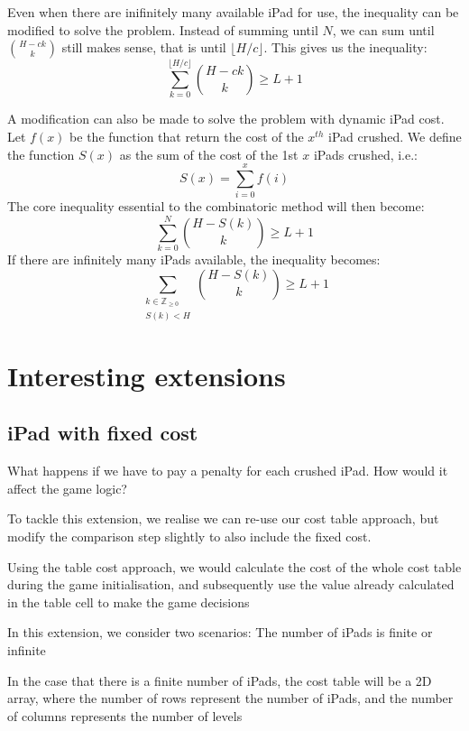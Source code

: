 \documentclass[12pt,a4paper,oneside]{report}
\begin{document}
Even when there are inifinitely many available iPad for use, the inequality can be modified to solve the problem. Instead of summing until $N$, we can sum until ${H-ck \choose k}$ still makes sense, that is until $\lfloor H/c \rfloor$. This gives us the inequality: \[\sum_{k=0}^{\lfloor H/c \rfloor} {H-ck \choose k} \geq L+1\]

A modification can also be made to solve the problem with dynamic iPad cost. Let $f(x)$ be the function that return the cost of the $x^{th}$ iPad crushed. We define the function $S(x)$ as the sum of the cost of the 1st $x$ iPads crushed, i.e.: \[S(x) = \sum_{i=0}^x f(i)\] The core inequality essential to the combinatoric method will then become: \[\sum_{k=0}^N {H-S(k) \choose k} \geq L+1\] If there are infinitely many iPads available, the inequality becomes: \[\sum_{\substack{k \in \mathbb{Z}_{\geq 0}\\ S(k) < H}} {H-S(k) \choose k} \geq L+1\]


\chapter{Interesting extensions}
\section{iPad with fixed cost}

What happens if we have to pay a penalty for each crushed iPad. How would it affect the game logic?

To tackle this extension, we realise we can re-use our cost table approach, but modify the comparison step slightly to also include the fixed cost. 

Using the table cost approach, we would calculate the cost of the whole cost table during the game initialisation, and subsequently use the value already calculated in the table cell to make the game decisions

In this extension, we consider two scenarios: The number of iPads is finite or infinite

In the case that there is a finite number of iPads, the cost table will be a 2D array, where the number of rows represent the number of iPads, and the number of columns represents the number of levels
\end{document}
